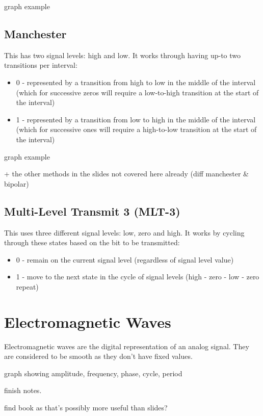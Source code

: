 \begin{todo}
    graph example
\end{todo}

\subsection{Manchester}
This has two signal levels: high and low. It works through having up-to two transitions per interval:
\begin{itemize}
    \item 0 - represented by a transition from high to low in the middle of the interval (which for successive zeros will require a low-to-high transition at the start of the interval)
    \item 1 - represented by a transition from low to high in the middle of the interval (which for successive ones will require a high-to-low transition at the start of the interval)
\end{itemize}

\begin{todo}
    graph example

    + the other methods in the slides not covered here already (diff manchester \& bipolar)
\end{todo}

\subsection{Multi-Level Transmit 3 (MLT-3)}
This uses three different signal levels: low, zero and high. It works by cycling through these states based on the bit to be transmitted:
\begin{itemize}
    \item 0 - remain on the current signal level (regardless of signal level value)
    \item 1 - move to the next state in the cycle of signal levels (high - zero - low - zero repeat)
\end{itemize}

\section{Electromagnetic Waves}
Electromagnetic waves are the digital representation of an analog signal. They are considered to be smooth as they don't have fixed values. 


\begin{todo}
graph showing amplitude, frequency, phase, cycle, period
\end{todo}

\begin{todo}
    finish notes.

    find book as that's possibly more useful than slides?
\end{todo}